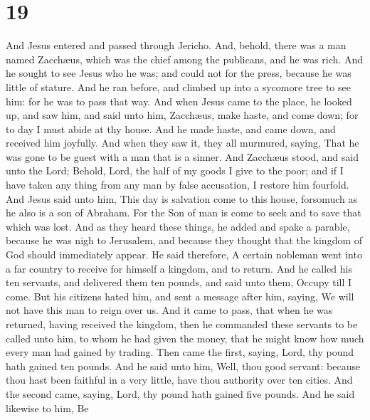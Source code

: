 \hypertarget{section-18}{%
\section{19}\label{section-18}}

 And Jesus entered and passed through Jericho.
 And, behold, there was a man named Zacchæus, which was
the chief among the publicans, and he was rich.  And he
sought to see Jesus who he was; and could not for the press, because he
was little of stature.  And he ran before, and climbed up
into a sycomore tree to see him: for he was to pass that way.
 And when Jesus came to the place, he looked up, and saw
him, and said unto him, Zacchæus, make haste, and come down; for to day
I must abide at thy house.  And he made haste, and came
down, and received him joyfully.  And when they saw it,
they all murmured, saying, That he was gone to be guest with a man that
is a sinner.  And Zacchæus stood, and said unto the Lord;
Behold, Lord, the half of my goods I give to the poor; and if I have
taken any thing from any man by false accusation, I restore him
fourfold.  And Jesus said unto him, This day is salvation
come to this house, forsomuch as he also is a son of Abraham.
 For the Son of man is come to seek and to save that
which was lost.  And as they heard these things, he added
and spake a parable, because he was nigh to Jerusalem, and because they
thought that the kingdom of God should immediately appear.
 He said therefore, A certain nobleman went into a far
country to receive for himself a kingdom, and to return. 
And he called his ten servants, and delivered them ten pounds, and said
unto them, Occupy till I come.  But his citizens hated
him, and sent a message after him, saying, We will not have this man to
reign over us.  And it came to pass, that when he was
returned, having received the kingdom, then he commanded these servants
to be called unto him, to whom he had given the money, that he might
know how much every man had gained by trading.  Then came
the first, saying, Lord, thy pound hath gained ten pounds.
 And he said unto him, Well, thou good servant: because
thou hast been faithful in a very little, have thou authority over ten
cities.  And the second came, saying, Lord, thy pound
hath gained five pounds.  And he said likewise to him, Be
